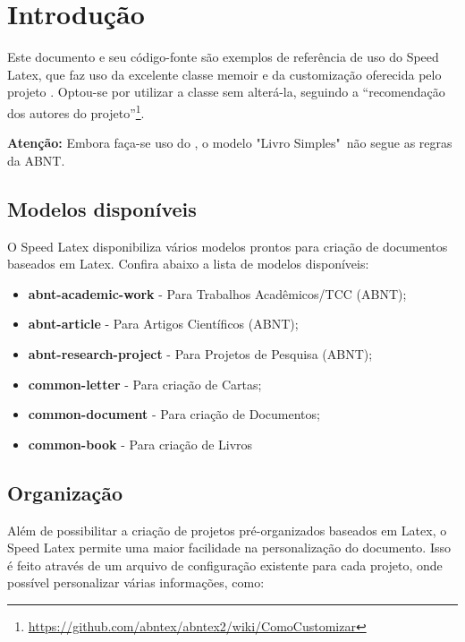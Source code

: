 
\chapter{Introdução}

Este documento e seu código-fonte são exemplos de referência de uso do Speed Latex,
que faz uso da excelente classe \textsf{memoir} e da customização oferecida pelo projeto \textsf{\abnTeX}. Optou-se por utilizar a classe \textsf{\abnTeX} sem alterá-la, seguindo a ``recomendação dos autores do projeto''\footnote{\url{https://github.com/abntex/abntex2/wiki/ComoCustomizar}}.

\textbf{Atenção:} Embora faça-se uso do \textsf{\abnTeX}, o modelo "Livro Simples"\ não segue as regras da ABNT.

\section{Modelos disponíveis}

O Speed Latex disponibiliza vários modelos prontos para criação de documentos baseados em Latex.
Confira abaixo a lista de modelos disponíveis:

\begin{itemize}

    \item \textbf{abnt-academic-work} - Para Trabalhos Acadêmicos/TCC (ABNT);
    \item \textbf{abnt-article} - Para Artigos Científicos (ABNT);
    \item \textbf{abnt-research-project} - Para Projetos de Pesquisa (ABNT);
    \item \textbf{common-letter} - Para criação de Cartas;
    \item \textbf{common-document} - Para criação de Documentos;
    \item \textbf{common-book} - Para criação de Livros

\end{itemize}

\section{Organização}

Além de possibilitar a criação de projetos pré-organizados baseados em Latex, o Speed Latex
permite uma maior facilidade na personalização do documento. Isso é feito através de um arquivo de configuração existente para cada projeto, onde possível personalizar várias informações, como:

